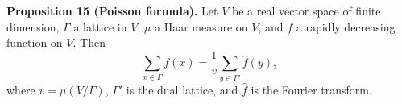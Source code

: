 \textbf{Proposition 15 (Poisson formula).} Let $V$ be a real vector space of finite dimension, $\Gamma$ a lattice in $V$, $\mu$ a Haar measure on $V$, and $f$ a rapidly decreasing function on $V$. Then
$$\sum_{x \in \Gamma} f(x) = \frac{1}{v} \sum_{y \in \Gamma'} \hat{f}(y),$$
where $v = \mu(V/\Gamma)$, $\Gamma'$ is the dual lattice, and $\hat{f}$ is the Fourier transform.
